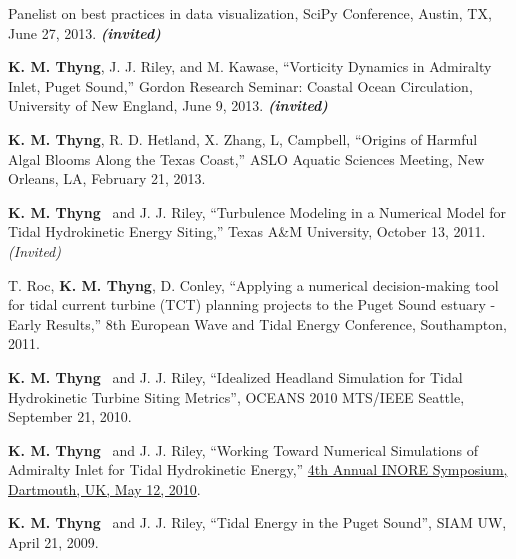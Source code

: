 \documentclass[10pt,letterpaper]{article}
\newcommand{\kmt}{\textbf{K. M. Thyng}}
\newcommand{\inv}{\textbf{\textit{(invited)}}}
\renewenvironment{itemize}{
  \begin{list}{}{
    \setlength{\leftmargin}{1.5em}
    \setlength{\itemsep}{0.25em}
    \setlength{\parskip}{0pt}
    \setlength{\parsep}{0.25em}
  }
}{
  \end{list}
}
\begin{document}
\begin{itemize}
\item Panelist on best practices in data visualization, SciPy Conference, Austin, TX, June 27, 2013. \inv

\item \kmt, J. J. Riley, and M. Kawase, ``Vorticity Dynamics in Admiralty Inlet, Puget Sound,'' Gordon Research Seminar: Coastal Ocean Circulation, University of New England, June 9, 2013. \inv

\item \kmt, R. D. Hetland, X. Zhang, L, Campbell, ``Origins of Harmful Algal Blooms Along the Texas Coast,'' ASLO Aquatic Sciences Meeting, New Orleans, LA, February 21, 2013.

\item \kmt~ and J. J. Riley, ``Turbulence Modeling in a Numerical Model for Tidal Hydrokinetic Energy Siting,'' Texas A\&M University, October 13, 2011. \textit{(Invited)}

\item T. Roc, \kmt, D. Conley, ``Applying a numerical decision-making tool for tidal current turbine (TCT) planning projects to the Puget Sound estuary - Early Results,'' 8th European Wave and Tidal Energy Conference, Southampton, 2011.





\item \kmt~ and J. J. Riley, ``Idealized Headland Simulation for Tidal Hydrokinetic Turbine Siting Metrics'', OCEANS 2010 MTS/IEEE Seattle, September 21, 2010.

\item \kmt~ and J. J. Riley, ``Working Toward Numerical Simulations of Admiralty Inlet for Tidal Hydrokinetic Energy,'' \href{http://inore.org/}{4th Annual INORE Symposium, Dartmouth, UK, May 12, 2010}.

\item \kmt~ and J. J. Riley, ``Tidal Energy in the Puget Sound'', SIAM UW, April 21, 2009.


\end{itemize}
\end{document}
